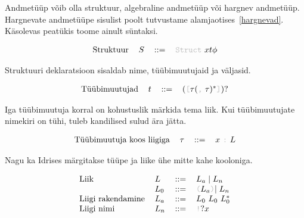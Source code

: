 \documentclass[12pt]{article}
\begin{document}
    Andmetüüp võib olla struktuur, algebraline andmetüüp või hargnev andmetüüp. Hargnevate andmetüüpe sisulist poolt tutvustame alamjaotises~\ref{hargnevad}. Käsolevas peatükis toome ainult süntaksi.

    \begin{equation*}
      \begin{tabular}{llll}
        Struktuur & $S$ & $::=$ & {\color{helehall}\verb!Struct!} $xt\phi$
      \end{tabular}
    \end{equation*}

    Struktuuri deklaratsioon sisaldab nime, tüübimuutujaid ja väljasid.

    \begin{equation*}
      \begin{tabular}{llll}
        Tüübimuutujad & $t$ & $::=$ & $(${\color{helehall}\verb![!}$\tau(${\color{helehall}\verb!,!} $\tau)^*${\color{helehall}\verb!]!}$)?$
      \end{tabular}
    \end{equation*}

    Iga tüübimuutuja korral on kohustuslik märkida tema liik. Kui tüübimuutujate nimekiri on tühi, tuleb kandilised sulud ära jätta.

    \begin{equation*}
      \begin{tabular}{llll}
        Tüübimuutuja koos liigiga & $\tau$ & $::=$ & $x$ {\color{helehall}\verb!:!} $L$
      \end{tabular}
    \end{equation*}

    Nagu ka Idrises märgitakse tüüpe ja liike ühe mitte kahe kooloniga.

    \begin{equation*}
      \begin{tabular}{llll}
        Liik              & $L$   & $::=$ & $L_a\mid L_n$                                                       \\
                          & $L_0$ & $::=$ & {\color{helehall}\verb!(!}$L_a${\color{helehall}\verb!)!}$\mid L_n$ \\
        Liigi rakendamine & $L_a$ & $::=$ & $L_0$ $L_0$ $L_0^*$                                                       \\
        Liigi nimi        & $L_n$ & $::=$ & {\color{helehall}\verb"!"}$?x$
      \end{tabular}
    \end{equation*}
\end{document}
